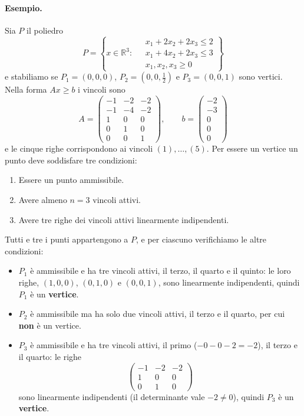 \paragraph{Esempio.}
Sia $P$ il poliedro
\[
P = \left\{ x \in \mathbb{R}^3 : \;
\begin{aligned}
&x_1 + 2x_2 + 2x_3 \le 2 \\
&x_1 + 4x_2 + 2x_3 \le 3 \\
&x_1, x_2, x_3 \ge 0
\end{aligned}
\right\}
\]
e stabiliamo se $P_1 = (0, 0, 0)$, $P_2 = (0, 0, \tfrac12)$ e $P_3 = (0, 0, 1)$ sono vertici. Nella forma $A x \ge b$ i vincoli sono
\[
A = \begin{pmatrix} -1 & -2 & -2 \\ -1 & -4 & -2 \\ 1 & 0 & 0 \\ 0 & 1 & 0 \\ 0 & 0 & 1 \end{pmatrix}, \qquad
b = \begin{pmatrix} -2 \\ -3 \\ 0 \\ 0 \\ 0 \end{pmatrix}
\]
e le cinque righe corrispondono ai vincoli $(1), \dots, (5)$. Per essere un vertice un punto deve soddisfare tre condizioni:
\begin{enumerate}
    \item Essere un punto ammissibile.
    \item Avere almeno $n = 3$ vincoli attivi.
    \item Avere tre righe dei vincoli attivi linearmente indipendenti.
\end{enumerate}
Tutti e tre i punti appartengono a $P$, e per ciascuno verifichiamo le altre condizioni:
\begin{itemize}
    \item $P_1$ è ammissibile e ha tre vincoli attivi, il terzo, il quarto e il quinto: le loro righe, $(1,0,0)$, $(0,1,0)$ e $(0,0,1)$, sono linearmente indipendenti, quindi $P_1$ è un \textbf{vertice}.
    \item $P_2$ è ammissibile ma ha solo due vincoli attivi, il terzo e il quarto, per cui \textbf{non} è un vertice.
    \item $P_3$ è ammissibile e ha tre vincoli attivi, il primo ($-0 - 0 - 2 = -2$), il terzo e il quarto: le righe
    \[
    \begin{pmatrix} -1 & -2 & -2 \\ 1 & 0 & 0 \\ 0 & 1 & 0 \end{pmatrix}
    \]
    sono linearmente indipendenti (il determinante vale $-2 \neq 0$), quindi $P_3$ è un \textbf{vertice}.
\end{itemize}

